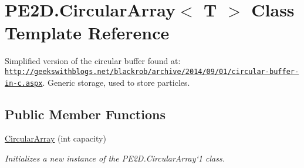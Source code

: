 \hypertarget{class_p_e2_d_1_1_circular_array}{}\section{P\+E2\+D.\+Circular\+Array$<$ T $>$ Class Template Reference}
\label{class_p_e2_d_1_1_circular_array}


Simplified version of the circular buffer found at\+: \href{http://geekswithblogs.net/blackrob/archive/2014/09/01/circular-buffer-in-c.aspx}{\tt http\+://geekswithblogs.\+net/blackrob/archive/2014/09/01/circular-\/buffer-\/in-\/c.\+aspx}. Generic storage, used to store particles.  


\subsection*{Public Member Functions}
\begin{DoxyCompactItemize}
\item 
\hyperlink{class_p_e2_d_1_1_circular_array_acde433a9238180ece9fc251ef05e1008}{Circular\+Array} (int capacity)
\begin{DoxyCompactList}\small\item\em Initializes a new instance of the P\+E2\+D.\+Circular\+Array`1 class. \end{DoxyCompactList}\end{DoxyCompactItemize}
